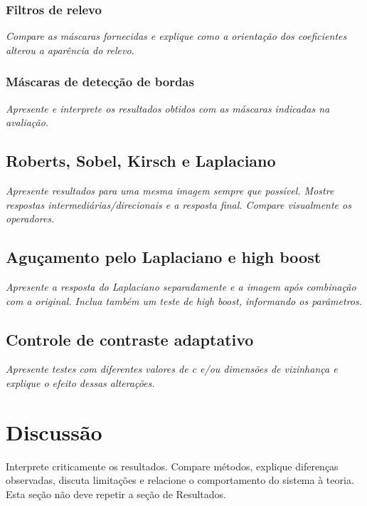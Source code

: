 \documentclass[11pt,a4paper]{article}
\newcommand{\placeholder}[1]{\textcolor{muted}{\textit{#1}}}
\begin{document}
\subsubsection{Filtros de relevo}
\placeholder{Compare as máscaras fornecidas e explique como a orientação dos coeficientes alterou a aparência do relevo.}

\subsubsection{Máscaras de detecção de bordas}
\placeholder{Apresente e interprete os resultados obtidos com as máscaras indicadas na avaliação.}

\subsection{Roberts, Sobel, Kirsch e Laplaciano}
\placeholder{Apresente resultados para uma mesma imagem sempre que possível. Mostre respostas intermediárias/direcionais e a resposta final. Compare visualmente os operadores.}

\subsection{Aguçamento pelo Laplaciano e high boost}
\placeholder{Apresente a resposta do Laplaciano separadamente e a imagem após combinação com a original. Inclua também um teste de high boost, informando os parâmetros.}

\subsection{Controle de contraste adaptativo}
\placeholder{Apresente testes com diferentes valores de c e/ou dimensões de vizinhança e explique o efeito dessas alterações.}

\section{Discussão}

\begin{orientacao}
Interprete criticamente os resultados. Compare métodos, explique diferenças observadas, discuta limitações e relacione o comportamento do sistema à teoria. Esta seção não deve repetir a seção de Resultados.
\end{orientacao}
\end{document}
